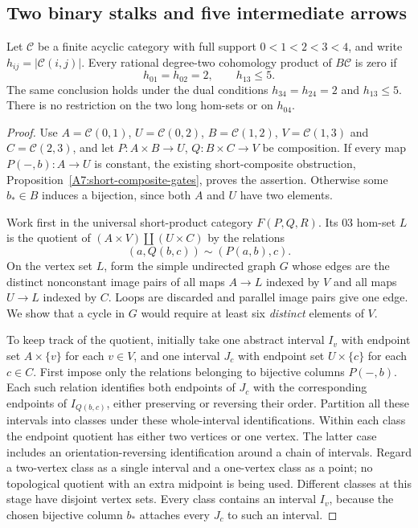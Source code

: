 \subsection{Two binary stalks and five intermediate arrows}

\begin{proposition}
\label{A7:two-binary-five-labels}
Let $\mathcal C$ be a finite acyclic category with full support
$0<1<2<3<4$, and write $h_{ij}=|\mathcal C(i,j)|$.
Every rational degree-two cohomology product of $B\mathcal C$
is zero if
\[
 h_{01}=h_{02}=2,\qquad h_{13}\leq5.
\]
The same conclusion holds under the dual conditions
$h_{34}=h_{24}=2$ and $h_{13}\leq5$.
There is no restriction on the two long hom-sets or on $h_{04}$.
\end{proposition}
\begin{proof}
Use $A=\mathcal C(0,1)$, $U=\mathcal C(0,2)$,
$B=\mathcal C(1,2)$, $V=\mathcal C(1,3)$ and
$C=\mathcal C(2,3)$, and let
$P:A\times B\to U$, $Q:B\times C\to V$ be composition.
If every map $P(-,b):A\to U$ is constant, the existing
short-composite obstruction, Proposition~\ref{A7:short-composite-gates},
proves the assertion. Otherwise some $b_*\in B$ induces a
bijection, since both $A$ and $U$ have two elements.

Work first in the universal short-product category $F(P,Q,R)$.
Its $03$ hom-set $L$ is the quotient of
$(A\times V)\amalg(U\times C)$ by the relations
\[
 (a,Q(b,c))\sim(P(a,b),c).
\]
On the vertex set $L$, form the simple undirected graph $G$
whose edges are the distinct nonconstant image pairs of all
maps $A\to L$ indexed by $V$ and all maps $U\to L$ indexed
by $C$. Loops are discarded and parallel image pairs give one
edge. We show that a cycle in $G$ would require at least six
\emph{distinct} elements of $V$.

To keep track of the quotient, initially take one abstract
interval $I_v$ with endpoint set $A\times\{v\}$ for each
$v\in V$, and one interval $J_c$ with endpoint set
$U\times\{c\}$ for each $c\in C$.
First impose only the relations belonging to bijective columns
$P(-,b)$. Each such relation identifies both endpoints of
$J_c$ with the corresponding endpoints of $I_{Q(b,c)}$,
either preserving or reversing their order. Partition all these
intervals into classes under these whole-interval identifications.
Within each class the endpoint quotient has either two vertices
or one vertex. The latter case includes an orientation-reversing
identification around a chain of intervals. Regard a two-vertex
class as a single interval and a one-vertex class as a point;
no topological quotient with an extra midpoint is being used.
Different classes at this stage have disjoint vertex sets.
Every class contains an interval $I_v$, because the chosen
bijective column $b_*$ attaches every $J_c$ to such an interval.


\end{proof}
